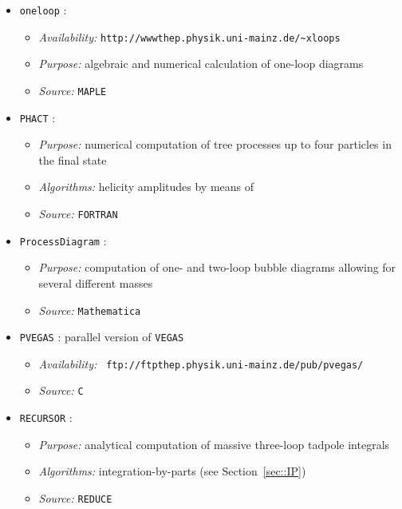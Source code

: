 \begin{itemize}

\item {\tt oneloop} \cite{oneloop}:
  \begin{itemize}
  \item{\it Availability:} {\tt http://wwwthep.physik.uni-mainz.de/\~\/xloops}
  \item{\it Purpose:} algebraic and numerical calculation of one-loop diagrams
  \item{\it Source:} {\tt MAPLE}
  \end{itemize}


\item{\tt PHACT} \cite{phact}:
  \begin{itemize}
  \item{\it Purpose:} numerical computation of tree processes up to four
    particles in the final state
  \item {\it Algorithms:} helicity amplitudes by means of
    \cite{BalMai95}
  \item{\it Source:} {\tt FORTRAN}
  \end{itemize}
  

\item {\tt ProcessDiagram} \cite{ProcDia}:
  \begin{itemize}
  \item{\it Purpose:} computation of one- and two-loop bubble diagrams
    allowing for several different masses
  \item {\it Source:} {\tt Mathematica}
  \end{itemize}


\item{\tt PVEGAS} \cite{pvegas}: parallel version of {\tt VEGAS}
  \begin{itemize}
  \item{\it Availability:} {\tt
      ftp://ftpthep.physik.uni-mainz.de/pub/pvegas/}
    \item{\it Source:} {\tt C}
  \end{itemize}
  

\item {\tt RECURSOR} \cite{recursor}:
  \begin{itemize}
  \item{\it Purpose:} analytical computation of massive three-loop tadpole
    integrals
  \item {\it Algorithms:} integration-by-parts (see Section~\ref{sec::IP})
  \item {\it Source:} {\tt REDUCE}
  \end{itemize}


\end{itemize}
